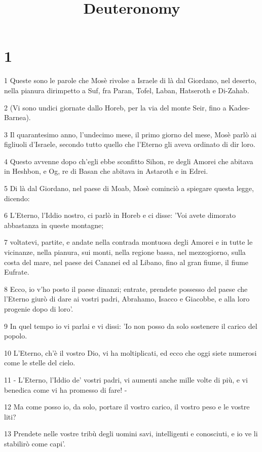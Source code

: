 

\title{Deuteronomy}


\chapter{1}

\par 1 Queste sono le parole che Mosè rivolse a Israele di là dal Giordano, nel deserto, nella pianura dirimpetto a Suf, fra Paran, Tofel, Laban, Hatseroth e Di-Zahab.
\par 2 (Vi sono undici giornate dallo Horeb, per la via del monte Seir, fino a Kades-Barnea).
\par 3 Il quarantesimo anno, l'undecimo mese, il primo giorno del mese, Mosè parlò ai figliuoli d'Israele, secondo tutto quello che l'Eterno gli aveva ordinato di dir loro.
\par 4 Questo avvenne dopo ch'egli ebbe sconfitto Sihon, re degli Amorei che abitava in Heshbon, e Og, re di Basan che abitava in Astaroth e in Edrei.
\par 5 Di là dal Giordano, nel paese di Moab, Mosè cominciò a spiegare questa legge, dicendo:
\par 6 L'Eterno, l'Iddio nostro, ci parlò in Horeb e ci disse: 'Voi avete dimorato abbastanza in queste montagne;
\par 7 voltatevi, partite, e andate nella contrada montuosa degli Amorei e in tutte le vicinanze, nella pianura, sui monti, nella regione bassa, nel mezzogiorno, sulla costa del mare, nel paese dei Cananei ed al Libano, fino al gran fiume, il fiume Eufrate.
\par 8 Ecco, io v'ho posto il paese dinanzi; entrate, prendete possesso del paese che l'Eterno giurò di dare ai vostri padri, Abrahamo, Isacco e Giacobbe, e alla loro progenie dopo di loro'.
\par 9 In quel tempo io vi parlai e vi dissi: 'Io non posso da solo sostenere il carico del popolo.
\par 10 L'Eterno, ch'è il vostro Dio, vi ha moltiplicati, ed ecco che oggi siete numerosi come le stelle del cielo.
\par 11 - L'Eterno, l'Iddio de' vostri padri, vi aumenti anche mille volte di più, e vi benedica come vi ha promesso di fare! -
\par 12 Ma come posso io, da solo, portare il vostro carico, il vostro peso e le vostre liti?
\par 13 Prendete nelle vostre tribù degli uomini savi, intelligenti e conosciuti, e io ve li stabilirò come capi'.

